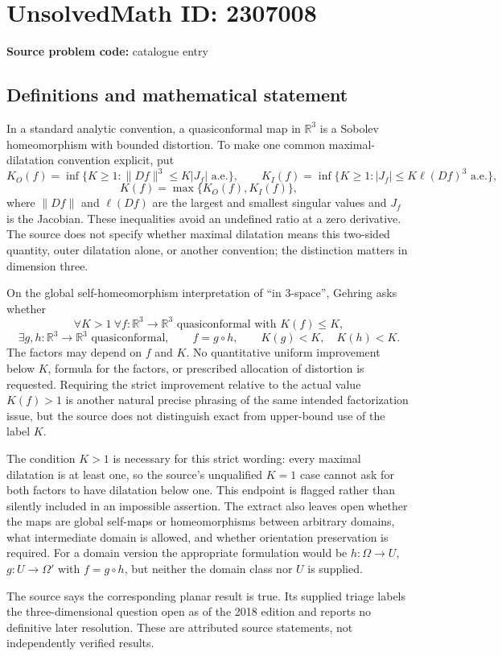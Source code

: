 \documentclass[11pt]{article}
\newcommand{\R}{\mathbb{R}}
\begin{document}
\section*{UnsolvedMath ID: 2307008}
\textbf{Source problem code:} catalogue entry
\subsection{Definitions and mathematical statement}
In a standard analytic convention, a quasiconformal map in $\R^3$ is a Sobolev homeomorphism with bounded distortion. To make one common maximal-dilatation convention explicit, put
\[
K_O(f)=\inf\{K\ge1:\|Df\|^3\le K|J_f|\text{ a.e.}\},\qquad
K_I(f)=\inf\{K\ge1:|J_f|\le K\ell(Df)^3\text{ a.e.}\},
\]
\[
K(f)=\max\{K_O(f),K_I(f)\},
\]
where $\|Df\|$ and $\ell(Df)$ are the largest and smallest singular values and $J_f$ is the Jacobian. These inequalities avoid an undefined ratio at a zero derivative. The source does not specify whether maximal dilatation means this two-sided quantity, outer dilatation alone, or another convention; the distinction matters in dimension three.

On the global self-homeomorphism interpretation of ``in $3$-space'', Gehring asks whether
\[
\forall K>1\ \forall f:\R^3\to\R^3\text{ quasiconformal with }K(f)\le K,
\]
\[
\exists g,h:\R^3\to\R^3\text{ quasiconformal},\qquad
f=g\circ h,\qquad K(g)<K,\quad K(h)<K.
\]
The factors may depend on $f$ and $K$. No quantitative uniform improvement below $K$, formula for the factors, or prescribed allocation of distortion is requested. Requiring the strict improvement relative to the actual value $K(f)>1$ is another natural precise phrasing of the same intended factorization issue, but the source does not distinguish exact from upper-bound use of the label $K$.

The condition $K>1$ is necessary for this strict wording: every maximal dilatation is at least one, so the source's unqualified $K=1$ case cannot ask for both factors to have dilatation below one. This endpoint is flagged rather than silently included in an impossible assertion. The extract also leaves open whether the maps are global self-maps or homeomorphisms between arbitrary domains, what intermediate domain is allowed, and whether orientation preservation is required. For a domain version the appropriate formulation would be $h:\Omega\to U$, $g:U\to\Omega'$ with $f=g\circ h$, but neither the domain class nor $U$ is supplied.

The source says the corresponding planar result is true. Its supplied triage labels the three-dimensional question open as of the 2018 edition and reports no definitive later resolution. These are attributed source statements, not independently verified results.
\end{document}
